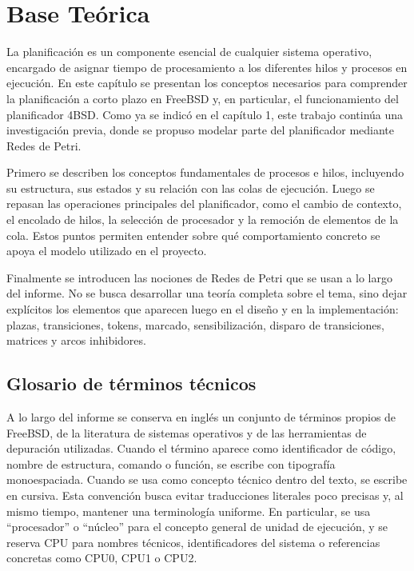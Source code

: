 \chapter{Base Teórica}

La planificación es un componente esencial de cualquier sistema operativo, encargado de asignar tiempo de procesamiento a los diferentes hilos y procesos en ejecución. En este capítulo se presentan los conceptos necesarios para comprender la planificación a corto plazo en FreeBSD y, en particular, el funcionamiento del planificador 4BSD. Como ya se indicó en el capítulo 1, este trabajo continúa una investigación previa\cite{bib1}, donde se propuso modelar parte del planificador mediante Redes de Petri.\par

Primero se describen los conceptos fundamentales de procesos e hilos, incluyendo su estructura, sus estados y su relación con las colas de ejecución. Luego se repasan las operaciones principales del planificador, como el cambio de contexto, el encolado de hilos, la selección de procesador y la remoción de elementos de la cola. Estos puntos permiten entender sobre qué comportamiento concreto se apoya el modelo utilizado en el proyecto.\par

Finalmente se introducen las nociones de Redes de Petri que se usan a lo largo del informe. No se busca desarrollar una teoría completa sobre el tema, sino dejar explícitos los elementos que aparecen luego en el diseño y en la implementación: plazas, transiciones, tokens, marcado, sensibilización, disparo de transiciones, matrices y arcos inhibidores.\par

\section*{Glosario de términos técnicos}

A lo largo del informe se conserva en inglés un conjunto de términos propios de FreeBSD, de la literatura de sistemas operativos y de las herramientas de depuración utilizadas. Cuando el término aparece como identificador de código, nombre de estructura, comando o función, se escribe con tipografía monoespaciada. Cuando se usa como concepto técnico dentro del texto, se escribe en cursiva. Esta convención busca evitar traducciones literales poco precisas y, al mismo tiempo, mantener una terminología uniforme. En particular, se usa ``procesador'' o ``núcleo'' para el concepto general de unidad de ejecución, y se reserva CPU para nombres técnicos, identificadores del sistema o referencias concretas como CPU0, CPU1 o CPU2.\par

